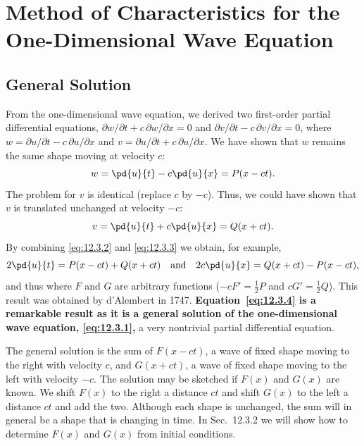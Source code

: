 \section{Method of Characteristics for the One-Dimensional Wave Equation}
\label{sec:char-wave-eq}

\subsection{General Solution}
\label{sec:char-wave-general}

From the one-dimensional wave equation,
we derived two first-order partial differential equations, $\partial w/\partial t + c\,\partial w/\partial x = 0$ and $\partial v/\partial t - c\,\partial v/\partial x = 0$, where $w = \partial u/\partial t - c\,\partial u/\partial x$ and $v = \partial u/\partial t + c\,\partial u/\partial x$.  We have shown that $w$ remains the same shape moving at velocity $c$:
\begin{equation}
\label{eq:12.3.2}
w = \pd{u}{t} - c\pd{u}{x} = P(x - ct).
\end{equation}
The problem for $v$ is identical (replace $c$ by $-c$).  Thus, we could have shown that $v$ is translated unchanged at velocity $-c$:
\begin{equation}
\label{eq:12.3.3}
v = \pd{u}{t} + c\pd{u}{x} = Q(x + ct).
\end{equation}
By combining \eqref{eq:12.3.2} and \eqref{eq:12.3.3} we obtain, for example,
\[
2\pd{u}{t} = P(x - ct) + Q(x + ct) \quad \text{and} \quad 2c\pd{u}{x} = Q(x + ct) - P(x - ct),
\]
and thus
where $F$ and $G$ are arbitrary functions ($-cF' = \tfrac{1}{2}P$ and $cG' = \tfrac{1}{2}Q$).  This result was obtained by d'Alembert in 1747.  \textbf{Equation~\eqref{eq:12.3.4} is a remarkable result as it is a general solution of the one-dimensional wave equation, \eqref{eq:12.3.1},} a very nontrivial partial differential equation.

The general solution is the sum of $F(x - ct)$, a wave of fixed shape moving to the right with velocity $c$, and $G(x + ct)$, a wave of fixed shape moving to the left with velocity $-c$.  The solution may be sketched if $F(x)$ and $G(x)$ are known.  We shift $F(x)$ to the right a distance $ct$ and shift $G(x)$ to the left a distance $ct$ and add the two.  Although each shape is unchanged, the sum will in general be a shape that is changing in time.  In Sec.~12.3.2 we will show how to determine $F(x)$ and $G(x)$ from initial conditions.


